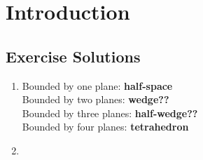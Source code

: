 \chapter{Introduction}
	
\section*{Exercise Solutions}

\begin{enumerate}
	\item Bounded by one plane: \textbf{half-space} \\
	Bounded by two planes: \textbf{wedge??} \\
	Bounded by three planes: \textbf{half-wedge??} \\
	Bounded by four planes: \textbf{tetrahedron}
	
	\item 
\end{enumerate}
